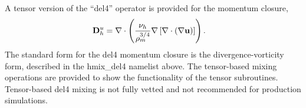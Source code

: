 A tensor version of the ``del4'' operator is provided for the momentum closure,
\begin{eqnarray}
\label{ocean:\mode_h_mom_del4_tensor}
& {\bf D}^u_h = \nabla\cdot\left( 
   \displaystyle\frac{\nu_h}{\rho_m^{3/4}} \nabla 
\left[
\nabla\cdot \left(
   \displaystyle \nabla {\bf u} \right)  \right]
  \right).
\end{eqnarray}
The standard form for the del4 momentum closure is the divergence-vorticity form, described in the hmix\_del4 namelist above.  The tensor-based mixing operations are provided to show the functionality of the tensor subroutines.  Tensor-based del4 mixing is not fully vetted and not recommended for production simulations.
